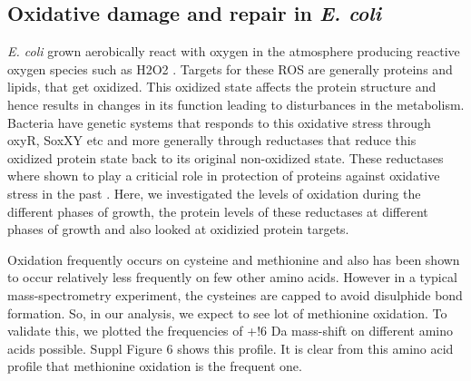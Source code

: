 \documentclass[12pt]{article}
\begin{document}
\subsection{Oxidative damage and repair in \emph{E. coli}}
%
%   
%   
%   
%

\emph{E. coli} grown aerobically react with oxygen in the atmosphere producing reactive oxygen species such as H2O2 \cite{GonzalezDemple1995}. Targets for these ROS are generally proteins and lipids, that get oxidized. This oxidized state affects the protein structure and hence results in changes in its function leading to disturbances in the metabolism. Bacteria have genetic systems that responds to this oxidative stress through oxyR, SoxXY etc and more generally through reductases that reduce this oxidized protein state back to its original non-oxidized state. These reductases where shown to play a criticial role in protection of proteins against oxidative stress in the past \cite{Vogt1995}. Here, we investigated the levels of oxidation during the different phases of growth, the protein levels of these reductases at different phases of growth and also looked at oxidizied protein targets.

Oxidation frequently occurs on cysteine and methionine and also has been shown to occur relatively less frequently on few other amino acids. However in a typical mass-spectrometry experiment, the cysteines are capped to avoid disulphide bond formation. So, in our analysis, we expect to see lot of methionine oxidation. To validate this, we plotted the frequencies of +!6 Da mass-shift on different amino acids possible. Suppl Figure 6 shows this profile. It is clear from this amino acid profile that methionine oxidation is the frequent one.
\end{document}
